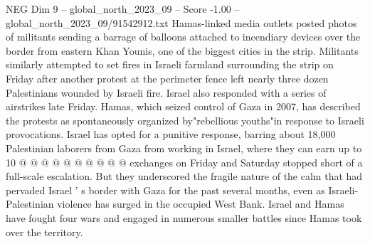 \begin{textsample}{NEG Dim 9 – global\_north\_2023\_09 – Score -1.00 – global\_north\_2023\_09/91542912.txt}
Hamas-linked media outlets posted photos of militants sending a barrage of balloons attached to incendiary devices over the border from eastern Khan Younis, one of the biggest cities in the strip.
Militants similarly attempted to set fires in Israeli farmland surrounding the strip on Friday after another protest at the perimeter fence left nearly three dozen Palestinians wounded by Israeli fire.
Israel also responded with a series of airstrikes late Friday.
Hamas, which seized control of Gaza in 2007, has described the protests as spontaneously organized by"rebellious youths"in response to Israeli provocations.
Israel has opted for a punitive response, barring about 18,000 Palestinian laborers from Gaza from working in Israel, where they can earn up to 10 @ @ @ @ @ @ @ @ @ @ exchanges on Friday and Saturday stopped short of a full-scale escalation.
But they underscored the fragile nature of the calm that had pervaded Israel ' s border with Gaza for the past several months, even as Israeli-Palestinian violence has surged in the occupied West Bank.
Israel and Hamas have fought four wars and engaged in numerous smaller battles since Hamas took over the territory.

\end{textsample}
